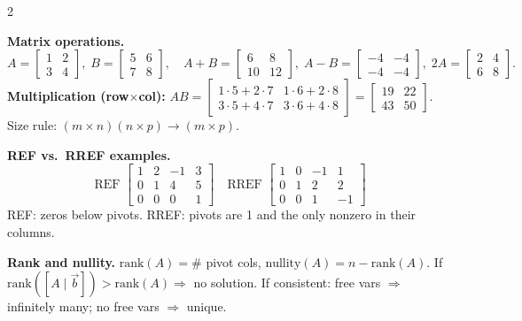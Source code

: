 \documentclass[8pt]{extarticle}
\renewcommand{\arraystretch}{0.93}
\begin{document}
\begin{multicols}{2}
\begin{tcolorbox}[title={Quick Reference -- Matrix Operations, Rank, Determinant \& Solving $A\vec{x}=\vec{b}$}, colframe=black!60!white, colback=gray!2, fontupper=\tiny]
\begingroup\setlength{\arraycolsep}{1.2pt}\renewcommand{\arraystretch}{0.9}
\textbf{Matrix operations.}
\[
A=\begin{bmatrix}1&2\\3&4\end{bmatrix},\;
B=\begin{bmatrix}5&6\\7&8\end{bmatrix},\quad
A+B=\begin{bmatrix}6&8\\10&12\end{bmatrix},\;
A-B=\begin{bmatrix}-4&-4\\-4&-4\end{bmatrix},\;
2A=\begin{bmatrix}2&4\\6&8\end{bmatrix}.
\]
\textbf{Multiplication (row$\times$col):}\;
\(
AB=\begin{bmatrix}
1\cdot5+2\cdot7 & 1\cdot6+2\cdot8\\
3\cdot5+4\cdot7 & 3\cdot6+4\cdot8
\end{bmatrix}
=\begin{bmatrix}19&22\\43&50\end{bmatrix}
\).
\;Size rule: \((m\times n)(n\times p)\to(m\times p)\).

\textbf{REF vs.\ RREF examples.}
\[
\text{REF }
\left[\!\begin{array}{ccc|c}
1&2&-1&3\\
0&1&4&5\\
0&0&0&1
\end{array}\!\right]
\quad
\text{RREF }
\left[\!\begin{array}{ccc|c}
1&0&-1&1\\
0&1&2&2\\
0&0&1&-1
\end{array}\!\right]
\]
REF: zeros below pivots. RREF: pivots are 1 and the only nonzero in their columns.

\textbf{Rank and nullity.}\;
\(\mathrm{rank}(A)=\#\) pivot cols,\;
\(\text{nullity}(A)=n-\mathrm{rank}(A)\).
If \(\mathrm{rank}([A\mid \vec b])>\mathrm{rank}(A)\Rightarrow\) no solution.
If consistent: free vars \(\Rightarrow\) infinitely many; no free vars \(\Rightarrow\) unique.


\end{tcolorbox}
\end{multicols}
\end{document}
